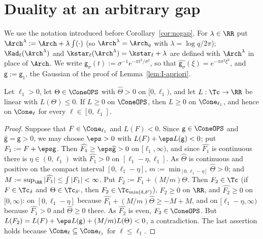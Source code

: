 \section{Duality at an arbitrary gap}\label{app:gap}

We use the notation introduced before Corollary~\ref{cor:nogap}. For $\lambda\in\RR$ put $\Arch^\lambda:=\Arch+\lambda\int(\cdot)$ (so
$\Arch^\lambda=\Arch_q$ with $\lambda=\log q/2\pi$); $\Kad_\ell(\Arch^\lambda)$ and $\kstar_\ell(\Arch^\lambda)=\kstar_\ell+\lambda$ are defined with
$\Arch^\lambda$ in place of $\Arch$. We write $\mathsf g_\sigma(t):=\sigma^{-1}e^{-\pi t^2/\sigma^2}$, so that
$\widehat{\mathsf g_\sigma}(\xi)=e^{-\pi\sigma^2\xi^2}$, and $\mathsf g:=\mathsf g_1$, the Gaussian of the proof of Lemma~\ref{lem:I-apriori}.

\begin{lemma}\label{lem:transfer}
Let $\ell_1>0$, let $\Theta\in\ConeOPS$ with $\widehat\Theta>0$ on $[0,\ell_1)$, and let $L:\Tc\to\RR$ be linear with $L(\Theta)\le0$. If $L\ge0$ on $\ConeOPS$,
then $L\ge0$ on $\Cone_{\ell_1}$, and hence on $\Cone_\ell$ for every $\ell\in[0,\ell_1]$.
\end{lemma}

\begin{proof}
Suppose that $F\in\Cone_{\ell_1}$ and $L(F)<0$. Since $\mathsf g\in\ConeOPS$ and $\widehat{\mathsf g}=\mathsf g>0$, we may choose $\eps>0$ with
$L(F)+\eps L(\mathsf g)<0$; put $F_1:=F+\eps\mathsf g$. Then $\widehat{F_1}\ge\eps\widehat{\mathsf g}>0$ on $[\ell_1,\infty)$, and since $\widehat{F_1}$ is
continuous there is $\eta\in(0,\ell_1)$ with $\widehat{F_1}>0$ on $[\ell_1-\eta,\ell_1]$. As $\widehat\Theta$ is continuous and positive on the compact interval
$[0,\ell_1-\eta]$, $m:=\min_{[0,\ell_1-\eta]}\widehat\Theta>0$; and $M:=\sup_\RR|\widehat{F_1}|\le\int|F_1|<\infty$. Put $F_2:=F_1+(M/m)\Theta$. Then
$F_2\in\Tc$ (if $F\in\Tc_\delta$ and $\Theta\in\Tc_{\delta'}$, then $F_2\in\Tc_{\min(\delta,\delta')}$), $F_2\ge0$ on $\RR$, and $\widehat{F_2}\ge0$ on
$[0,\infty)$: on $[0,\ell_1-\eta]$ because $\widehat{F_1}+(M/m)\widehat\Theta\ge-M+M$, and on $[\ell_1-\eta,\infty)$ because $\widehat{F_1}>0$ and
$\widehat\Theta\ge0$ there. As $\widehat{F_2}$ is even, $F_2\in\ConeOPS$. But $L(F_2)=L(F)+\eps L(\mathsf g)+(M/m)L(\Theta)<0$, a contradiction. The
last assertion holds because $\Cone_\ell\subseteq\Cone_{\ell_1}$ for $\ell\le \ell_1$.
\end{proof}

